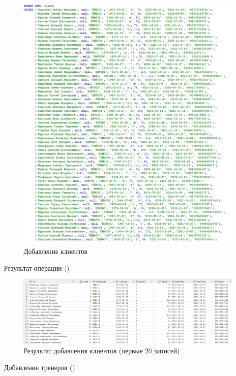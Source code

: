 \documentclass[a4paper,14pt]{article}
\begin{document}
	\begin{figure}[H]
		\centering		
		\includegraphics[width=\linewidth]{image/insertClient}
		\caption{Добавление клиентов}\label{img:insertClient}
	\end{figure} 
	
	Результат операции ()
	
	\begin{figure}[H]
		\centering		
		\includegraphics[width=\linewidth]{image/selectClient}
		\caption{Результат добавления клиентов (первые 20 записей)}\label{img:selectClient}
	\end{figure} 

	Добавление тренеров ()
\end{document}
